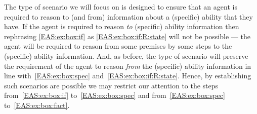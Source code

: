 \begin{note}
  The type of scenario we will focus on is designed to ensure that an agent is required to reason to (and from) information about a (specific) ability that they have.
  If the agent is required to reason \emph{to} (specific) ability information then rephrasing \ref{EAS:ex:box:if} as \ref{EAS:ex:box:if:R:state} will not be possible --- the agent will be required to reason from some premises by some steps to the (specific) ability information.
  And, as before, the type of scenario will preserve the requirement of the agent to reason \emph{from} the (specific) ability information in line with~\ref{EAS:ex:box:spec} and~\ref{EAS:ex:box:if:R:state}.
  Hence, by establishing such scenarios are possible we may restrict our attention to the steps from~\ref{EAS:ex:box:if} to~\ref{EAS:ex:box:spec} and from~\ref{EAS:ex:box:spec} to~\ref{EAS:ex:box:fact}.
\end{note}


